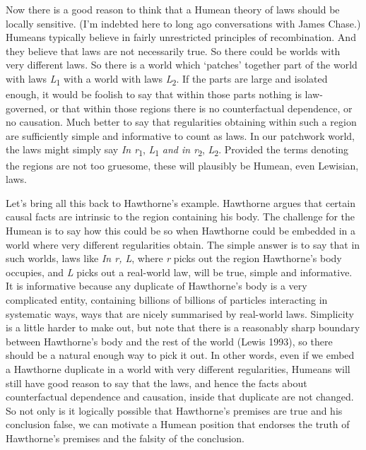 Now there is a good reason to think that a Humean theory of laws should be locally sensitive. (I'm indebted here to long ago conversations with James Chase.) Humeans typically believe in fairly unrestricted principles of recombination. And they believe that laws are not necessarily true. So there could be worlds with very different laws. So there is a world which `patches' together part of the world with laws \textit{L}\textsubscript{1} with a world with laws \textit{L}\textsubscript{2}. If the parts are large and isolated enough, it would be foolish to say that within those parts nothing is law-governed, or that within those regions there is no counterfactual dependence, or no causation. Much better to say that regularities obtaining within such a region are sufficiently simple and informative to count as laws. In our patchwork world, the laws might simply say \textit{In r}\textsubscript{1}, \textit{L}\textsubscript{1} \textit{and in r}\textsubscript{2}, \textit{L}\textsubscript{2}. Provided the terms denoting the regions are not too gruesome, these will plausibly be Humean, even Lewisian, laws.

Let's bring all this back to Hawthorne's example. Hawthorne argues that certain causal facts are intrinsic to the region containing his body. The challenge for the Humean is to say how this could be so when Hawthorne could be embedded in a world where very different regularities obtain. The simple answer is to say that in such worlds, laws like \textit{In r, L}, where \textit{r} picks out the region Hawthorne's body occupies, and \textit{L} picks out a real-world law, will be true, simple and informative. It is informative because any duplicate of Hawthorne's body is a very complicated entity, containing billions of billions of particles interacting in systematic ways, ways that are nicely summarised by real-world laws. Simplicity is a little harder to make out, but note that there is a reasonably sharp boundary between Hawthorne's body and the rest of the world (Lewis 1993), so there should be a natural enough way to pick it out. In other words, even if we embed a Hawthorne duplicate in a world with very different regularities, Humeans will still have good reason to say that the laws, and hence the facts about counterfactual dependence and causation, inside that duplicate are not changed. So not only is it logically possible that Hawthorne's premises are true and his conclusion false, we can motivate a Humean position that endorses the truth of Hawthorne's premises and the falsity of the conclusion.

